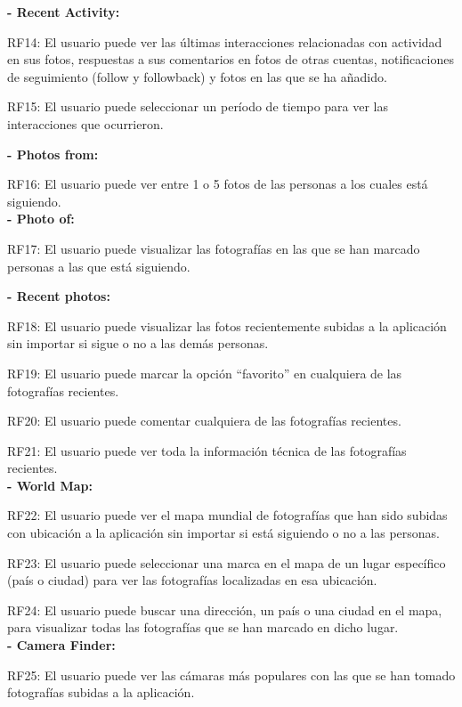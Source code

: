 \documentclass{memoria}
\begin{document}
\textbf{- Recent Activity:}

RF14: El usuario puede ver las últimas interacciones relacionadas con actividad en sus fotos, respuestas a sus comentarios en fotos de otras cuentas, notificaciones de seguimiento (follow y followback) y fotos en las que se ha añadido.

RF15: El usuario puede seleccionar un período de tiempo para ver las interacciones que ocurrieron.\\


\textbf{- Photos from:} 

RF16: El usuario puede  ver entre 1 o 5 fotos de las personas a los cuales está siguiendo.\\

\textbf{- Photo of:} 

RF17: El usuario puede visualizar las fotografías en las que se han marcado personas a las que está siguiendo.\\


\textbf{- Recent photos:}

RF18: El usuario puede visualizar las fotos recientemente subidas a la aplicación sin importar si sigue o no a las demás personas.

RF19: El usuario puede marcar la opción “favorito” en cualquiera de las fotografías recientes.

RF20: El usuario puede comentar cualquiera de las fotografías recientes.

RF21: El usuario puede ver toda la información técnica de las fotografías recientes.\\

\textbf{- World Map:}

RF22: El usuario puede ver el mapa mundial de fotografías que han sido subidas con ubicación a la aplicación sin importar si está siguiendo o no a las personas.

RF23: El usuario puede seleccionar una marca en el mapa de un lugar específico (país o ciudad) para ver las fotografías localizadas en esa ubicación.

RF24: El usuario puede buscar una dirección, un país o una ciudad  en el mapa, para visualizar todas las fotografías que se han marcado en dicho lugar.\\

\textbf{- Camera Finder:}

RF25: El usuario puede ver las cámaras más populares con las que se han tomado fotografías subidas a la aplicación.
\end{document}
